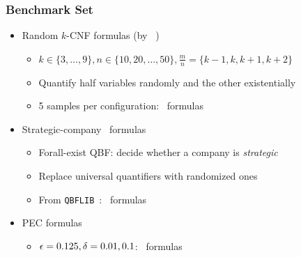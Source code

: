 \begin{frame}
    \frametitle{Benchmark Set}
    \begin{itemize}
        \item Random $k$-CNF formulas (by \cnfgen~\cite{Lauria2017CNFgen})
              \pause
              \begin{itemize}
                  \item $k\in\{3,\ldots,9\},n\in\{10,20,\ldots,50\},\frac{m}{n}=\{k-1,k,k+1,k+2\}$
                        \pause
                  \item Quantify half variables randomly and the other existentially
                        \pause
                  \item \num{5} samples per configuration: \nrandom~formulas
                        \pause
              \end{itemize}
        \item Strategic-company~\cite{Cadoli1997} formulas
              \pause
              \begin{itemize}
                  \item Forall-exist QBF: decide whether a company is \textit{strategic}
                        \pause
                  \item Replace universal quantifiers with randomized ones
                        \pause
                  \item From \texttt{QBFLIB}~\cite{Narizzano2006}: \nstrategic~formulas
                        \pause
              \end{itemize}
        \item PEC formulas
              \pause
              \begin{itemize}
                  \item $\epsilon=0.125,\delta=0.01,0.1$: \npec~formulas
              \end{itemize}
    \end{itemize}
\end{frame}

